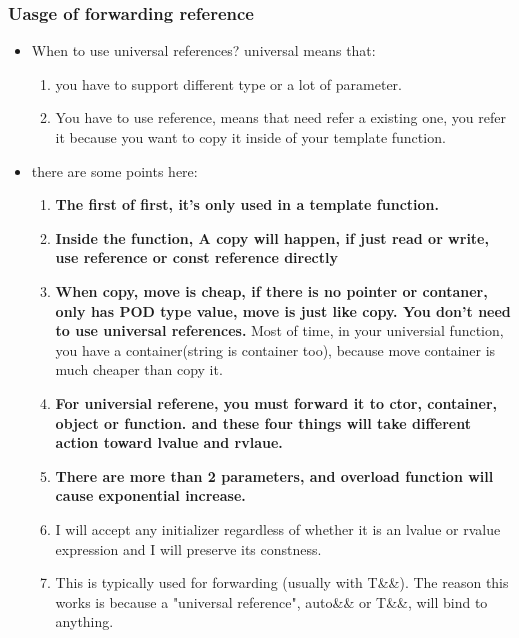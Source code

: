 \documentclass[a4paper,12pt,twoside]{book}
\begin{document}
\subsubsection{Uasge of forwarding reference}
\begin{itemize}
\item When to use universal references? universal means that:
\begin{enumerate}
	\item you have to support different type or a lot of parameter. 
	\item You have to use reference, means that need refer a existing one, you refer it because you want to copy it inside of your template function. 
\end{enumerate}

\item there are some points here:
	\begin{enumerate}
		\item \textbf{The first of first, it's only used in a template function.}
		
		\item \textbf{Inside the function, A copy will happen, if just read or write, use reference or const reference directly}
		
		\item \textbf{When copy, move is cheap, if there is no pointer or contaner, only has POD type value, move is just like copy. You don't need to use universal references.} Most of time, in your universial function, you have a container(string is container too), because move container is much cheaper than copy it.
		
		\item \textbf{For universial referene, you must forward it to ctor, container, object or function. and these four things will take different action toward lvalue and rvlaue.}
		
		\item \textbf{There are more than 2 parameters, and overload function will cause exponential increase.}

		\item I will accept any initializer regardless of whether it is an lvalue or rvalue expression and I will preserve its constness. 

		\item This is typically used for forwarding (usually with T\&\&). The reason this works is because a "universal reference", auto\&\& or T\&\&, will bind to anything.  


\end{enumerate}
\end{itemize}
\end{document}
